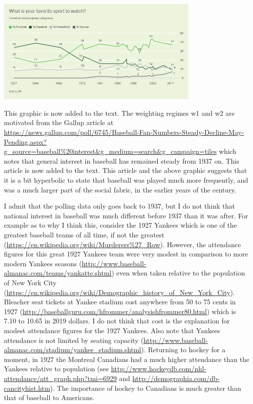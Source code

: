 \documentclass[11pt]{article}
\begin{document}
\begin{center}
\includegraphics[width=0.75\textwidth]{Gallupfavoritesport.png}
\end{center}
This graphic is now added to the text.
The weighting regimes w1 and w2 are motivated from the Gallup article at 
\url{https://news.gallup.com/poll/6745/Baseball-Fan-Numbers-Steady-Decline-May-Pending.aspx?g_source=baseball%20interest&g_medium=search&g_campaign=tiles}
which notes that general interest in baseball has remained steady from 
1937 on.  This article is now added to the text.  This article and the above 
graphic suggests that it is a bit hyperbolic to state that baseball was 
played much more frequently, and was a much larger part of the social fabric, 
in the earlier years of the century.


I admit that the polling data only goes back to 1937, but I do not think that 
national interest in baseball was much different before 1937 than it was 
after.  For example as to why I think this, consider the 1927 Yankees which 
is one of the greatest baseball teams of all time, if not the greatest 
(\url{https://en.wikipedia.org/wiki/Murderers%27_Row}).  
However, the attendance 
figures for this great 1927 Yankees team were very modest in comparison to 
more modern Yankees seasons 
(\url{http://www.baseball-almanac.com/teams/yankatte.shtml})
even when taken relative to the population of New York City 
(\url{https://en.wikipedia.org/wiki/Demographic_history_of_New_York_City}).
Bleacher seat tickets at Yankee stadium cost anywhere from 50 to 75 cents  
in 1927 (\url{http://baseballguru.com/hfrommer/analysishfrommer80.html}) 
which is 7.10 to 10.65 in 2019 dollars. I do not think that cost is the 
explanation for modest attendance figures for the 1927 Yankees.  Also note 
that Yankees attendance is not limited by seating capacity 
(\url{http://www.baseball-almanac.com/stadium/yankee_stadium.shtml}).
Returning to hockey for a moment, in 1927 the Montreal Canadians had a much 
higher attendance than the Yankees relative to population 
(see \url{http://www.hockeydb.com/nhl-attendance/att_graph.php?tmi=6929} and 
\url{http://demographia.com/db-cancityhist.htm}).  The importance of hockey 
to Canadians is much greater than that of baseball to Americans. 
\end{document}

